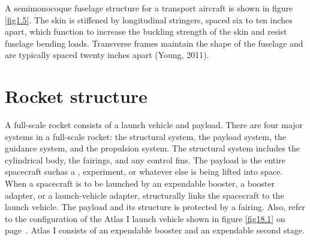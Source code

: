 \documentclass{AeroStructure-ERJohnson}
\begin{document}
{\def\thefigure{1.5}
}



A semimonocoque fuselage structure for a transport aircraft is shown in
figure \ref{fig1.5}. The skin is stiffened by
longitudinal stringers, spaced six to ten inches apart, which function to
increase the buckling strength of the skin and resist fuselage bending
loads. Transverse frames maintain the shape of the fuselage and are
typically spaced twenty inches apart (Young, 2011).


\section{Rocket structure}

A full-scale rocket consists of a launch vehicle and payload. There are four
major systems in a full-scale rocket: the structural system, the payload
system, the guidance system, and the propulsion system. The structural
system includes the cylindrical body, the fairings, and any control fins.
The payload is the entire spacecraft such\break as a , experiment, or
whatever else is being lifted into space. When a spacecraft is to be
launched by an expendable booster, a booster adapter, or a launch-vehicle
adapter, structurally links the spacecraft to the launch vehicle. The
payload and its structure is protected by a fairing. Also, refer to the
configuration of the Atlas I launch vehicle shown in figure \ref{fig18.1} on
page~\pageref{fig18.1}. Atlas I consists of an expendable booster and an expendable second
stage.
\end{document}
